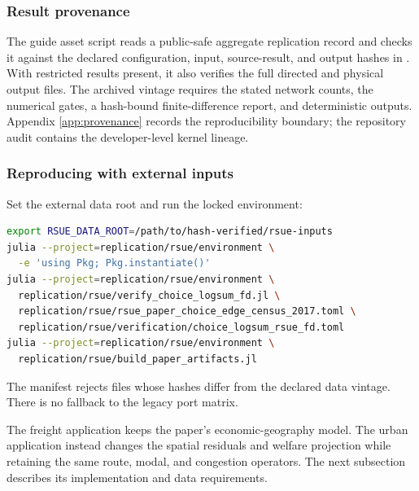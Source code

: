 \subsubsection{Result provenance}

The guide asset script reads a public-safe aggregate replication record and
checks it against the declared configuration, input, source-result, and output
hashes in . With restricted
results present, it also verifies the full directed and physical output files.
The archived vintage requires the stated network counts, the numerical gates,
a hash-bound finite-difference report, and deterministic outputs. Appendix
\ref{app:provenance} records the reproducibility boundary; the repository audit
contains the developer-level kernel lineage.

\subsubsection{Reproducing with external inputs}

Set the external data root and run the locked environment:
\begin{lstlisting}[language=bash]
export RSUE_DATA_ROOT=/path/to/hash-verified/rsue-inputs
julia --project=replication/rsue/environment \
  -e 'using Pkg; Pkg.instantiate()'
julia --project=replication/rsue/environment \
  replication/rsue/verify_choice_logsum_fd.jl \
  replication/rsue/rsue_paper_choice_edge_census_2017.toml \
  replication/rsue/verification/choice_logsum_rsue_fd.toml
julia --project=replication/rsue/environment \
  replication/rsue/build_paper_artifacts.jl
\end{lstlisting}
The manifest rejects files whose hashes differ from the declared data vintage.
There is no fallback to the legacy port matrix.

The freight application keeps the paper's economic-geography model. The
urban application instead changes the spatial residuals and welfare projection
while retaining the same route, modal, and congestion operators. The next
subsection describes its implementation and data requirements.

